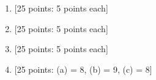 \documentclass[11pt]{article}
\begin{document}
\begin{enumerate}

\item {[25 points: 5 points each]}
\vspace*{.5em}


\newpage
\item {[25 points: 5 points each]}
\vspace*{.5em}


\newpage
\item {[25 points: 5 points each]}
\vspace*{.5em}


\newpage
\item {[25 points: (a) = 8, (b) = 9, (c) = 8]}
\vspace*{.5em}



%

%

\end{enumerate}
\end{document}

